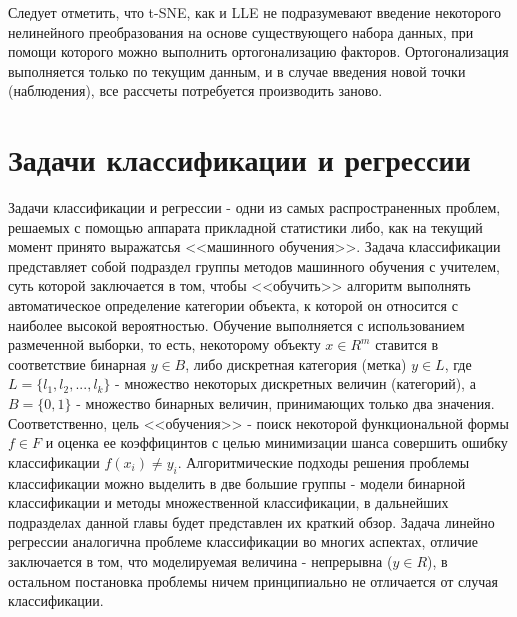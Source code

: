 \documentclass[runningheads]{llncs}
\begin{document}
Следует отметить, что t-SNE, как и LLE не подразумевают введение некоторого нелинейного преобразования на основе существующего набора данных, при помощи которого можно выполнить ортогонализацию факторов. Ортогонализация выполняется только по текущим данным, и в случае введения новой точки (наблюдения), все рассчеты потребуется производить заново.


\section*{Задачи классификации и регрессии}
\hspace{0.4cm}
Задачи классификации и регрессии - одни из самых распространенных проблем, решаемых с помощью аппарата прикладной статистики либо, как на текущий момент принято выражатсья <<машинного обучения>>. Задача классификации представляет собой подраздел группы методов машинного обучения с учителем, суть которой заключается в том, чтобы <<обучить>> алгоритм выполнять автоматическое определение категории объекта, к которой он относится с наиболее высокой вероятностью. Обучение выполняется с использованием размеченной выборки, то есть, некоторому объекту $x \in R^m$ ставится в соответствие бинарная $y \in B$, либо дискретная категория (метка) $y \in L$, где $L = \{l_1, l_2, ..., l_k\}$ - множество некоторых дискретных величин (категорий), а $B = \{0, 1\}$ - множество бинарных величин, принимающих только два значения. Соответственно, цель <<обучения>> - поиск некоторой функциональной формы $f \in F$ и оценка ее коэффицинтов с целью минимизации шанса совершить ошибку классификации $f(x_i) \neq y_i$. Алгоритмические подходы решения проблемы классификации можно выделить в две большие группы - модели бинарной классификации и методы множественной классификации, в дальнейших подразделах данной главы будет представлен их краткий обзор. Задача линейно регрессии аналогична проблеме классификации во многих аспектах, отличие заключается в том, что моделируемая величина - непрерывна ($y \in R$), в остальном постановка проблемы ничем принципиально не отличается от случая классификации.
\end{document}
